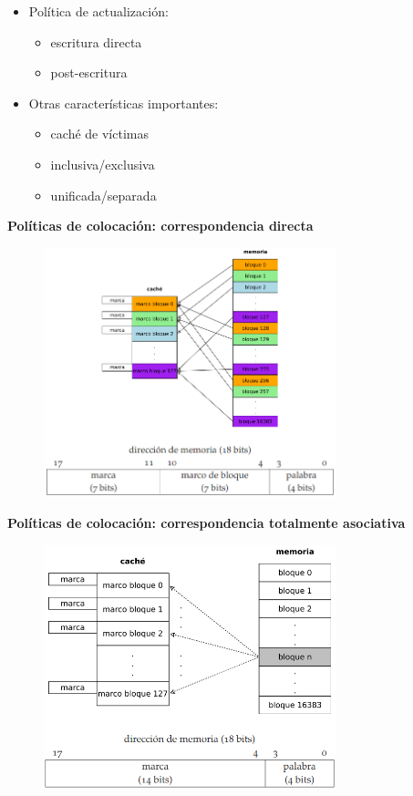 \documentclass{article}
\begin{document}
\begin{itemize}
\item Política de actualización:
	\begin{itemize}
	\item escritura directa
	\item post-escritura
	\end{itemize}

\item Otras características importantes:
	\begin{itemize}
	\item caché de víctimas
	\item inclusiva/exclusiva
	\item unificada/separada
	\end{itemize}
\end{itemize}

\textbf{Políticas de colocación: correspondencia directa}
\begin{figure}[h]
\centering
\includegraphics[scale=1,width=85mm]{correspondenciadirecta.png}
\end{figure}
\newpage

\textbf{Políticas de colocación: correspondencia totalmente asociativa}
\begin{figure}[h]
\centering
\includegraphics[scale=1,width=85mm]{totalmenteasociativa.png}
\end{figure}
\end{document}
